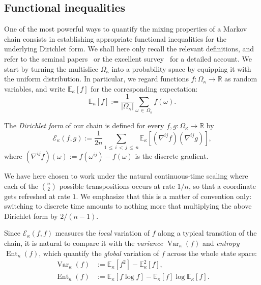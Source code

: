 \documentclass[AHL,Unicode,longabstracts,published]{cedram}
\newcommand{\R}{\mathbb{R}}
\newcommand{\EE}{\mathbb{E}}
\newcommand{\cE}{\mathcal{E}}
\DeclareMathOperator{\ent}{Ent}
\DeclareMathOperator{\var}{Var}
\begin{document}
\subsection{Functional inequalities}
One of the most powerful ways to quantify the mixing properties of a Markov chain consists in establishing appropriate functional inequalities for the underlying {Dirichlet form}. We shall here only recall the relevant definitions, and refer to the seminal papers~\cite{MR2120475,MR1410112} or the excellent survey~\cite{MR2341319} for a detailed account. We start by turning the multislice $\Omega_\kappa$ into a probability space by equipping it with the uniform distribution. In particular, we regard functions $f\colon\Omega_\kappa\to\R$ as random variables, and write $\EE_\kappa[f]$ for the corresponding expectation:
\[
\EE_\kappa[f] := \frac{1}{\left|\Omega_\kappa\right|}\sum_{\omega\,\in\,\Omega_\kappa}f(\omega).
\]

The \emph{Dirichlet form} of our chain is defined for every $f,g\colon\Omega_\kappa\to\R$ by
\begin{equation}\label{def:dir}
\cE_\kappa\left(f,g\right) := \frac{1}{2n}\sum_{1\,\le\,i\,<\,j\,\le\,n}\EE_\kappa\left[\left(\nabla^{ij}f\right)\left(\nabla^{ij}g\right)\right],
\end{equation}
where $(\nabla^{ij}f)(\omega):=f(\omega^{ij})-f(\omega)$ is the discrete gradient.

\begin{rema}[Scaling]
We have here chosen to work under the natural continu\-ous-time scaling where each of the $\binom{n}{2}$ possible transpositions occurs at rate $1/n$, so that a coordinate gets refreshed at rate $1$. We emphasize that this is a matter of convention only: switching to discrete time amounts to nothing more that multiplying the above Dirichlet form by $2/(n-1)$.
\end{rema}

Since $\cE_\kappa(f,f)$ measures the \emph{local} variation of $f$ along a typical transition of the chain, it is natural to compare it with the \emph{variance} $\var_\kappa(f)$ and \emph{entropy} $\ent_\kappa(f)$, which quantify the \emph{global} variation of $f$ across the whole state space:
\begin{align*}
\var_\kappa(f) & := \EE_\kappa\left[f^2\right]-\EE^2_\kappa[f],\\
\ent_\kappa(f) & := \EE_\kappa\left[f\log f\right]-\EE_\kappa[f]\log\EE_\kappa[f].
\end{align*}
\end{document}
